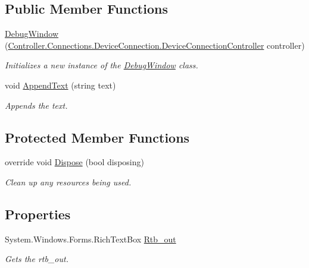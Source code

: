 \subsection*{Public Member Functions}
\begin{DoxyCompactItemize}
\item 
\hyperlink{class_a_rdev_kit_1_1_view_1_1_debug_window_adafb78ca129ce982501f18a95a6dfda2}{Debug\-Window} (\hyperlink{class_a_rdev_kit_1_1_controller_1_1_connections_1_1_device_connection_1_1_device_connection_controller}{Controller.\-Connections.\-Device\-Connection.\-Device\-Connection\-Controller} controller)
\begin{DoxyCompactList}\small\item\em Initializes a new instance of the \hyperlink{class_a_rdev_kit_1_1_view_1_1_debug_window}{Debug\-Window} class. \end{DoxyCompactList}\item 
void \hyperlink{class_a_rdev_kit_1_1_view_1_1_debug_window_a699da7b94cba73ded382cbe7d09d259e}{Append\-Text} (string text)
\begin{DoxyCompactList}\small\item\em Appends the text. \end{DoxyCompactList}\end{DoxyCompactItemize}
\subsection*{Protected Member Functions}
\begin{DoxyCompactItemize}
\item 
override void \hyperlink{class_a_rdev_kit_1_1_view_1_1_debug_window_a3fd0798bf834ad179cf33e1e43549e2c}{Dispose} (bool disposing)
\begin{DoxyCompactList}\small\item\em Clean up any resources being used. \end{DoxyCompactList}\end{DoxyCompactItemize}
\subsection*{Properties}
\begin{DoxyCompactItemize}
\item 
System.\-Windows.\-Forms.\-Rich\-Text\-Box \hyperlink{class_a_rdev_kit_1_1_view_1_1_debug_window_a0b6022986bb5968dac5184d2024c6fca}{Rtb\-\_\-out}
\begin{DoxyCompactList}\small\item\em Gets the rtb\-\_\-out. \end{DoxyCompactList}\end{DoxyCompactItemize}


